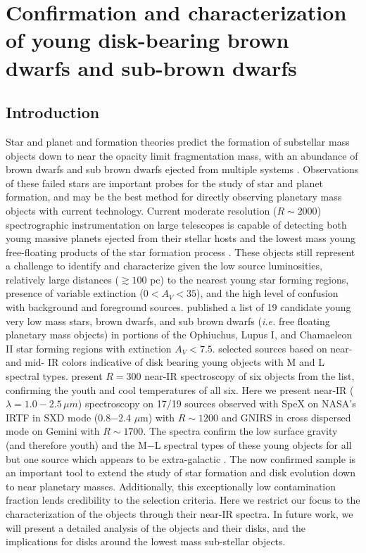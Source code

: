 \chapter{Confirmation and characterization of young disk-bearing brown dwarfs and sub-brown dwarfs}
\label{ch_CS16}

\section{Introduction}
Star and planet and formation theories predict the formation of substellar mass objects down to near the opacity limit fragmentation mass, with an abundance of brown dwarfs and sub brown dwarfs ejected from multiple systems \citep{bate02,bate09}.  Observations of these failed stars are important probes for the study of star and planet formation, and may be the best method for directly observing planetary mass objects with current technology.  Current moderate resolution ($R\sim2000$) spectrographic instrumentation on large telescopes is capable of detecting both young massive planets ejected from their stellar hosts and the lowest mass young free-floating products of the star formation process \citep{2005ApJ...620L..51L}.  These objects still represent a challenge to identify and characterize given the low source luminosities, relatively large distances ($\gtrsim 100$ pc) to the nearest young star forming regions, presence of variable extinction ($0 < A_{V} < 35$), and the high level of confusion with background and foreground sources.  \citet{allers06} published a list of 19 candidate young very low mass stars, brown dwarfs, and sub brown dwarfs (\emph{i.e.} free floating planetary mass objects) in portions of the Ophiuchus, Lupus I, and Chamaeleon II star forming regions with extinction $A_{V} < 7.5$.  \citeauthor{allers06} selected sources based on near- and mid- IR colors indicative of disk bearing young objects with M and L spectral types.  \citet{allers07} present $R=300$ near-IR spectroscopy of six objects from the \citet{allers06} list, confirming the youth and cool temperatures of all six.  Here we present near-IR ($\lambda=1.0-2.5 \,\mu m$) spectroscopy on 17/19 sources observed with SpeX on NASA's IRTF \citep{rayner03, cushing04, vacca03} in SXD mode (0.8$-$2.4 $\mu$m) with $R\sim1200$ and GNIRS \citep{elias1998,elias06} in cross dispersed mode on Gemini with $R\sim1700$.  The spectra confirm the low surface gravity (and therefore youth) and the M$-$L spectral types of these young objects for all but one source which appears to be extra-galactic \citep{rayjay06}.  The now confirmed sample is an important tool to extend the study of star formation and disk evolution down to near planetary masses.  Additionally, this exceptionally low contamination fraction lends credibility to the selection criteria.  Here we restrict our focus to the characterization of the objects through their near-IR spectra.  In future work, we will present a detailed analysis of the objects and their disks, and the implications for disks around the lowest mass sub-stellar objects.

